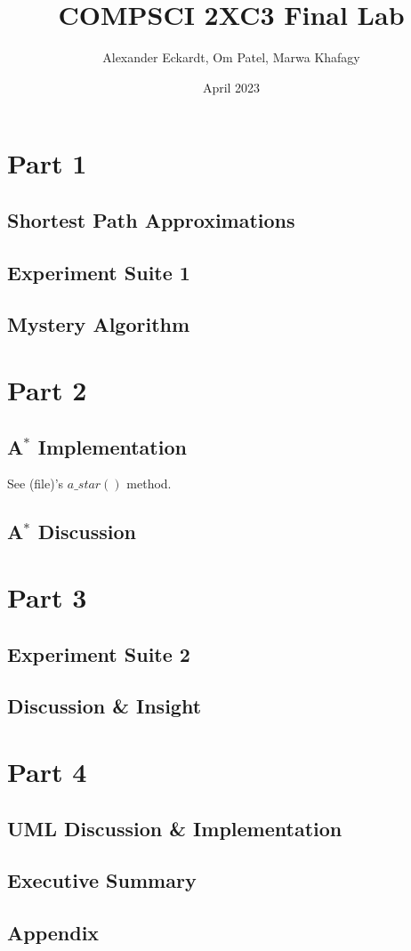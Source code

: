 \documentclass{article}
\title{COMPSCI 2XC3 Final Lab}
\author{Alexander Eckardt, Om Patel, Marwa Khafagy}
\date{April 2023}
\begin{document}
\maketitle
\newpage

\tableofcontents
\newpage

\listoffigures
\newpage


\section{Part 1}
\subsection{Shortest Path Approximations}
\subsection{Experiment Suite 1}
\subsection{Mystery Algorithm}

\newpage
\section{Part 2}
\subsection{A$^{*}$ Implementation}
    See (file)'s $a\_star()$ method.
    
\subsection{A$^{*}$ Discussion}


\newpage
\section{Part 3}
\subsection{Experiment Suite 2}
\subsection{Discussion \& Insight}


\newpage
\section{Part 4}
\subsection{UML Discussion \& Implementation}

\newpage
\subsection{Executive Summary}

\newpage
\subsection{Appendix}
\end{document}

